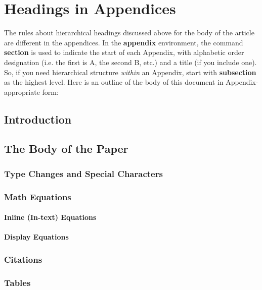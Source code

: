 \documentclass{sig-alternate-05-2015}
\begin{document}
%

%
%
\appendix
\section{Headings in Appendices}
The rules about hierarchical headings discussed above for
the body of the article are different in the appendices.
In the \textbf{appendix} environment, the command
\textbf{section} is used to
indicate the start of each Appendix, with alphabetic order
designation (i.e. the first is A, the second B, etc.) and
a title (if you include one).  So, if you need
hierarchical structure
\textit{within} an Appendix, start with \textbf{subsection} as the
highest level. Here is an outline of the body of this
document in Appendix-appropriate form:
\subsection{Introduction}
\subsection{The Body of the Paper}
\subsubsection{Type Changes and  Special Characters}
\subsubsection{Math Equations}
\paragraph{Inline (In-text) Equations}
\paragraph{Display Equations}
\subsubsection{Citations}
\subsubsection{Tables}
\end{document}
